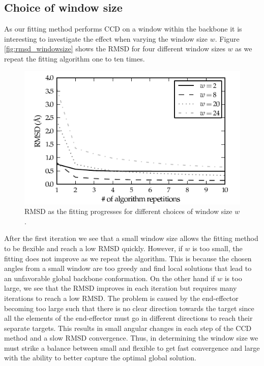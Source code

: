 \subsection{Choice of window size}
As our fitting method performs CCD on a window within the backbone it is interesting to investigate the effect when varying the window size $w$.
Figure \ref{fig:rmsd_windowsize} shows the RMSD for four different window sizes $w$ as we repeat the fitting algorithm one to ten times.
\begin{figure}
	\centering
	\hspace*{-3.5mm}\includegraphics[width=1.1\columnwidth]{figures/plot_rmsd_convergence}
	\caption{RMSD as the fitting progresses for different choices of window size $w$.}
	\label{fig:rmsd_convergence}
\end{figure}
After the first iteration we see that a small window size allows the fitting method to be flexible and reach a low RMSD quickly.
However, if $w$ is too small, the fitting does not improve as we repeat the algorithm.
This is because the chosen angles from a small window are too greedy and find local solutions that lead to an unfavorable global backbone conformation.
On the other hand if $w$ is too large, we see that the RMSD improves in each iteration but requires many iterations to reach a low RMSD.
The problem is caused by the end-effector becoming too large such that there is no clear direction towards the target since all the elements of the end-effector must go in different directions to reach their separate targets.
This results in small angular changes in each step of the CCD method and a slow RMSD convergence.
Thus, in determining the window size we must strike a balance between small and flexible to get fast convergence and large with the ability to better capture the optimal global solution.
